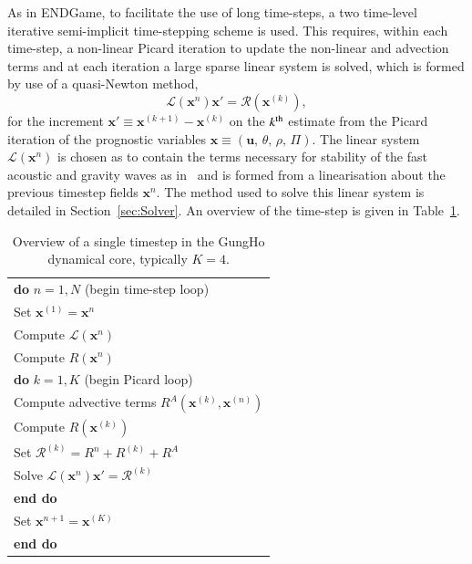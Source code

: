 \documentclass[review,times]{elsarticle}
\providecommand{\tabularnewline}{\\}
\begin{document}
As in ENDGame, to facilitate the use of long time-steps, a two time-level 
iterative semi-implicit time-stepping scheme is used. This requires, within each 
time-step, a non-linear Picard iteration to update the non-linear and advection terms 
and at each iteration a large sparse linear system is solved, which is formed by 
use of a quasi-Newton method,
%
\begin{equation}
\mathcal{L}\left(\mathbf{x}^n\right)\mathbf{x}' = \mathcal{R}\left(\mathbf{x}^{(k)}\right),\label{eq:quasi-newton}
\end{equation}
%
for the increment $\mathbf{x}'\equiv\mathbf{x}^{(k+1)}-\mathbf{x}^{(k)}$ on the $k^{\rm{th}}$ 
estimate from the Picard iteration of the prognostic variables $\mathbf{x}\equiv\left(\mathbf{u},\,\theta,\,\rho,\,\Pi\right)$. 
The linear system $\mathcal{L}\left(\mathbf{x}^n\right)$ is chosen as to contain the terms necessary for stability of 
the fast acoustic and gravity waves as in~\cite{QJ:QJ2235} and is formed from a linearisation about the previous 
timestep fields $\mathbf{x}^n$. The method used to solve this linear system is detailed in Section~\ref{sec:Solver}. 
An overview of the time-step is given in Table~\ref{tab:timestep}.
%
\begin{table}
\begin{centering}
\begin{tabular}{l}
\hline 
\textbf{do} $n=1,N$ (begin time-step loop)\tabularnewline
\hspace{0.5cm}Set $\mathbf{x}^{(1)} = \mathbf{x}^n$\tabularnewline
\hspace{0.5cm}Compute $\mathcal{L}\left(\mathbf{x}^n\right)$\tabularnewline
\hspace{0.5cm}Compute $R\left(\mathbf{x}^n\right)$\tabularnewline
\hspace{0.5cm}\textbf{do} $k=1,K$ (begin Picard loop)\tabularnewline
\hspace{1.0cm}Compute advective terms $R^A\left(\mathbf{x}^{(k)},\mathbf{x}^{(n)}\right)$\tabularnewline
\hspace{1.0cm}Compute $R\left(\mathbf{x}^{(k)}\right)$\tabularnewline
\hspace{1.0cm}Set $\mathcal{R}^{(k)} = R^n + R^{(k)} + R^A$\tabularnewline

\hspace{1.0cm}Solve $\mathcal{L}\left(\mathbf{x}^n\right)\mathbf{x}' = \mathcal{R}^{(k)}$\tabularnewline
\hspace{0.5cm}\textbf{end do}\tabularnewline
\hspace{0.5cm}Set $\mathbf{x}^{n+1} = \mathbf{x}^{(K)}$\tabularnewline
\textbf{end do}\tabularnewline
\hline
\end{tabular}
\end{centering}
\caption{\label{tab:timestep}Overview of a single timestep in the GungHo dynamical core, typically $K=4$.}
\end{table}
%
\end{document}
